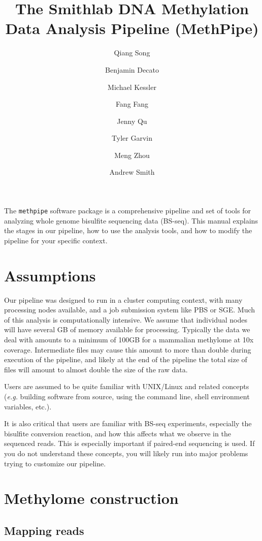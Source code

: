 \documentclass[10pt]{article}
\title{The Smithlab DNA Methylation Data Analysis Pipeline (MethPipe)}
\author{Qiang Song \and Benjamin Decato \and Michael Kessler \and Fang Fang
\and Jenny Qu \and Tyler Garvin \and Meng Zhou \and Andrew Smith}
\newcommand{\meth}{\texttt{methpipe}}
\begin{document}
\maketitle


The \meth{} software package is a comprehensive pipeline and set of
tools for analyzing whole genome bisulfite sequencing data
(BS-seq). This manual explains the stages in our pipeline, how to use
the analysis tools, and how to modify the pipeline for your specific
context.

\tableofcontents

\newpage


\section{Assumptions}

Our pipeline was designed to run in a cluster computing context, with
many processing nodes available, and a job submission system like PBS
or SGE. Much of this analysis is computationally intensive. We assume
that individual nodes will have several GB of memory available for
processing. Typically the data we deal with amounts to a minimum of
100GB for a mammalian methylome at 10x coverage. Intermediate files
may cause this amount to more than double during execution of the
pipeline, and likely at the end of the pipeline the total size of
files will amount to almost double the size of the raw data.

Users are assumed to be quite familiar with UNIX/Linux and related
concepts ({\em e.g.} building software from source, using the command
line, shell environment variables, etc.).

It is also critical that users are familiar with BS-seq experiments,
especially the bisulfite conversion reaction, and how this affects
what we observe in the sequenced reads. This is especially important
 if paired-end sequencing is used. If you do not understand these
 concepts, you will likely run into major problems trying to customize our pipeline.

\section{Methylome construction}

\subsection{Mapping reads}
\label{sec:mapping}
\end{document}
